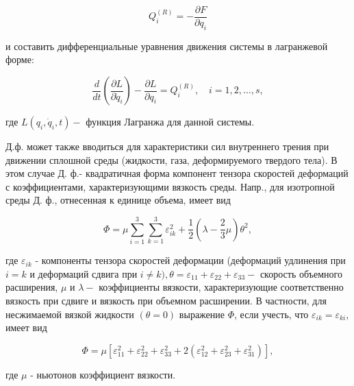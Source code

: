 \documentclass[10pt]{article}
\begin{document}
\[

Q_{i}^{(R)}=-\frac{\partial F}{\partial q_{i}}

\]



и составить дифференциальные уравнения движения системы в лагранжевой форме:



\[

\frac{d}{d t}\left(\frac{\partial L}{\partial \dot{q}_{i}}\right)-\frac{\partial L}{\partial q_{i}}=Q_{i}^{(R)}, \quad i=1,2, \ldots, s,

\]



где $L\left(q_{i}, \dot{q}_{i}, t\right)-$ функция Лагранжа для данной системы.



Д.ф. может также вводиться для характеристики сил внутреннего трения при движении сплошной среды (жидкости, газа, деформируемого твердого тела). В этом случае Д. ф.- квадратичная форма компонент тензора скоростей деформаций с коэффициентами, характеризующими вязкость среды. Напр., для изотропной среды Д. ф., отнесенная к единице объема, имеет вид



\[

\Phi=\mu \sum_{i=1}^{3} \sum_{k=1}^{3} \varepsilon_{i k}^{2}+\frac{1}{2}\left(\lambda-\frac{2}{3} \mu\right) \theta^{2},

\]



где $\varepsilon_{i k}$ - компоненты тензора скоростей деформации (деформаций удлинения при $i=k$ и деформаций сдвига при $i \neq k), \theta=\varepsilon_{11}+\varepsilon_{22}+\varepsilon_{33}-$ скорость объемного расширения, $\mu$ и $\lambda-$ коэффициенты вязкости, характеризующие соответственно вязкость при сдвиге и вязкость при объемном расширении. В частности, для несжимаемой вязкой жидкости $(\theta=0)$ выражение $\Phi$, если учесть, что $\varepsilon_{i k}=\varepsilon_{k i}$, имеет вид



\[

\Phi=\mu\left[\varepsilon_{11}^{2}+\varepsilon_{22}^{2}+\varepsilon_{33}^{2}+2\left(\varepsilon_{12}^{2}+\varepsilon_{23}^{2}+\varepsilon_{31}^{2}\right)\right],

\]



где $\mu$ - ньютонов коэффициент вязкости.
\end{document}
